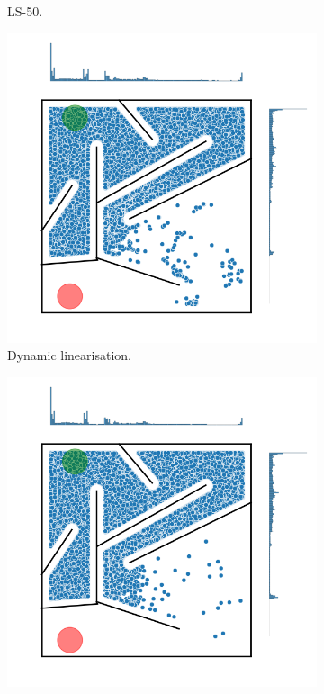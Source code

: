 \begin{figure}[H]
\begin{mdframed}
\begin{subfigure}[b]{0.5\textwidth}
            \caption{LS-50.}
        \end{subfigure}
        \begin{subfigure}[b]{0.5\textwidth}
            \includegraphics[scale=0.4]{resources/mazes/dynamic_hard_all.png}
            \caption{Dynamic linearisation.}
        \end{subfigure}
        \begin{subfigure}[b]{0.5\textwidth}
            \includegraphics[scale=0.4]{resources/mazes/novelty_injection_hard_all.png}

\end{subfigure}
\end{mdframed}
\end{figure}
